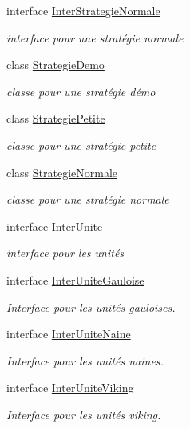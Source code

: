 \begin{DoxyCompactItemize}
interface \hyperlink{interface_small_world_1_1_inter_strategie_normale}{Inter\-Strategie\-Normale}
\begin{DoxyCompactList}\small\item\em interface pour une stratégie normale \end{DoxyCompactList}\item 
class \hyperlink{class_small_world_1_1_strategie_demo}{Strategie\-Demo}
\begin{DoxyCompactList}\small\item\em classe pour une stratégie démo \end{DoxyCompactList}\item 
class \hyperlink{class_small_world_1_1_strategie_petite}{Strategie\-Petite}
\begin{DoxyCompactList}\small\item\em classe pour une stratégie petite \end{DoxyCompactList}\item 
class \hyperlink{class_small_world_1_1_strategie_normale}{Strategie\-Normale}
\begin{DoxyCompactList}\small\item\em classe pour une stratégie normale \end{DoxyCompactList}\item 
interface \hyperlink{interface_small_world_1_1_inter_unite}{Inter\-Unite}
\begin{DoxyCompactList}\small\item\em interface pour les unités \end{DoxyCompactList}\item 
interface \hyperlink{interface_small_world_1_1_inter_unite_gauloise}{Inter\-Unite\-Gauloise}
\begin{DoxyCompactList}\small\item\em Interface pour les unités gauloises. \end{DoxyCompactList}\item 
interface \hyperlink{interface_small_world_1_1_inter_unite_naine}{Inter\-Unite\-Naine}
\begin{DoxyCompactList}\small\item\em Interface pour les unités naines. \end{DoxyCompactList}\item 
interface \hyperlink{interface_small_world_1_1_inter_unite_viking}{Inter\-Unite\-Viking}
\begin{DoxyCompactList}\small\item\em Interface pour les unités viking. \end{DoxyCompactList}\item 

\end{DoxyCompactItemize}
